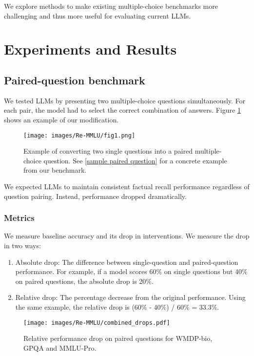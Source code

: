 \documentclass{article}
\begin{document}
We explore methods to make existing multiple-choice benchmarks more challenging and thus more useful for evaluating current LLMs.

\section{Experiments and Results}
\subsection{Paired-question benchmark}

We tested LLMs by presenting two multiple-choice questions simultaneously. For each pair, the model had to select the correct combination of answers. Figure \ref{fig:pairing example} shows an example of our modification.

\begin{figure}[tb]
    \centering
    \texttt{[image: images/Re-MMLU/fig1.png]}
    \caption{Example of converting two single questions into a paired multiple-choice question. See \ref{sample paired question} for a concrete example from our benchmark.}
    \label{fig:pairing example}
\end{figure}

We expected LLMs to maintain consistent factual recall performance regardless of question pairing. Instead, performance dropped dramatically.

\subsubsection{Metrics}

We measure baseline accuracy and its drop in interventions. We measure the drop in two ways:

\begin{enumerate}
    \item Absolute drop: The difference between single-question and paired-question performance. For example, if a model scores 60\% on single questions but 40\% on paired questions, the absolute drop is 20\%.
    \item Relative drop: The percentage decrease from the original performance. Using the same example, the relative drop is (60\% - 40\%) / 60\% = 33.3\%.
\end{enumerate}

\begin{figure}[htb]
    \centering
    \texttt{[image: images/Re-MMLU/combined\_drops.pdf]}
    \caption{Relative performance drop on paired questions for WMDP-bio, GPQA and MMLU-Pro.}
    \label{fig:relative performance drop, all benchmarks}
\end{figure}
\end{document}
